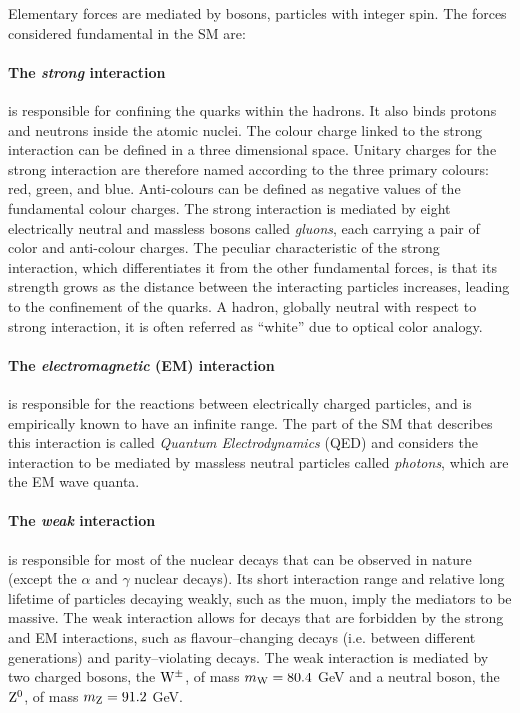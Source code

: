 Elementary forces are mediated by bosons, particles with integer spin. The forces considered fundamental in the SM are:

\paragraph{The \emph{strong} interaction} is responsible for confining the quarks within the hadrons. It also binds protons and neutrons inside the atomic nuclei. The colour charge linked to the strong interaction can be defined in a three dimensional space. Unitary charges for the strong interaction are therefore named according to the three primary colours: red, green, and blue. Anti-colours can be defined as negative values of the fundamental colour charges. The strong interaction is mediated by eight electrically neutral and massless bosons called \emph{gluons}, each carrying a pair of color and anti-colour charges. The peculiar characteristic of the strong interaction, which differentiates it from the other fundamental forces, is that its strength grows as  the distance between the interacting particles increases, leading to the confinement of the quarks. A hadron, globally neutral with respect to strong interaction, it is often referred as ``white'' due to optical color analogy.

\paragraph{The \emph{electromagnetic} (EM) interaction} is responsible for the reactions between electrically charged particles, and is empirically known to have an infinite range. The part of the SM that describes this interaction is called \emph{Quantum Electrodynamics} (QED) and considers the interaction to be mediated by massless neutral particles called \emph{photons}, which are the EM wave quanta.

\paragraph{The \emph{weak} interaction} is responsible for most of the nuclear decays that can be observed in nature (except the $\alpha$ and $\gamma$ nuclear decays). Its short interaction range and relative long lifetime of particles decaying weakly, such as the muon, imply the mediators to be massive. The weak interaction allows for decays that are forbidden by the strong and EM interactions, such as flavour--changing decays (i.e. between different generations) and parity--violating decays. The weak interaction is mediated by two charged bosons, the $\mathrm{W}^\pm$, of mass $m_{\mathrm{W}} = 80.4$ GeV and a neutral boson, the $\mathrm{Z}^{0}$, of mass $m_{\mathrm{Z}} = 91.2$ GeV.

